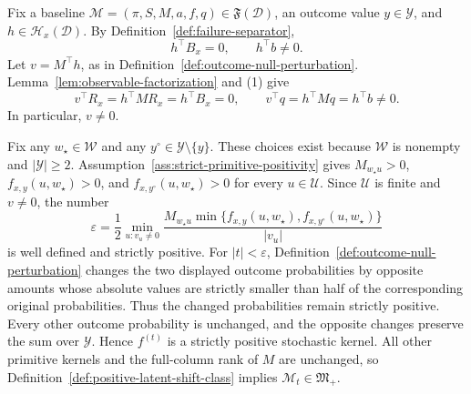 Fix a baseline \(\mathcal M=(\pi,S,M,a,f,q)\in\mathfrak F(\mathcal D)\), an outcome value \(y\in\mathcal Y\), and \(h\in\mathcal H_x(\mathcal D)\). By Definition~\ref{def:failure-separator},
\[
h^{\top}B_x=0,
\qquad
h^{\top}b\ne0.
\tag{1}
\]
Let \(v=M^{\top}h\), as in Definition~\ref{def:outcome-null-perturbation}. Lemma~\ref{lem:observable-factorization} and (1) give
\[
v^{\top}R_x=h^{\top}MR_x=h^{\top}B_x=0,
\qquad
v^{\top}q=h^{\top}Mq=h^{\top}b\ne0.
\tag{2}
\]
In particular, \(v\ne0\).

Fix any \(w_{\star}\in\mathcal W\) and any \(y^{\circ}\in\mathcal Y\setminus\{y\}\). These choices exist because \(\mathcal W\) is nonempty and \(\lvert\mathcal Y\rvert\ge2\). Assumption~\ref{ass:strict-primitive-positivity} gives \(M_{w_{\star}u}>0\), \(f_{x,y}(u,w_{\star})>0\), and \(f_{x,y^{\circ}}(u,w_{\star})>0\) for every \(u\in\mathcal U\). Since \(\mathcal U\) is finite and \(v\ne0\), the number
\[
\varepsilon
=\frac12\min_{u:v_u\ne0}
\frac{M_{w_{\star}u}\min\{f_{x,y}(u,w_{\star}),
f_{x,y^{\circ}}(u,w_{\star})\}}{|v_u|}
\tag{3}
\]
is well defined and strictly positive. For \(|t|<\varepsilon\), Definition~\ref{def:outcome-null-perturbation} changes the two displayed outcome probabilities by opposite amounts whose absolute values are strictly smaller than half of the corresponding original probabilities. Thus the changed probabilities remain strictly positive. Every other outcome probability is unchanged, and the opposite changes preserve the sum over \(\mathcal Y\). Hence \(f^{(t)}\) is a strictly positive stochastic kernel. All other primitive kernels and the full-column rank of \(M\) are unchanged, so Definition~\ref{def:positive-latent-shift-class} implies \(\mathcal M_t\in\mathfrak M_{+}\).

